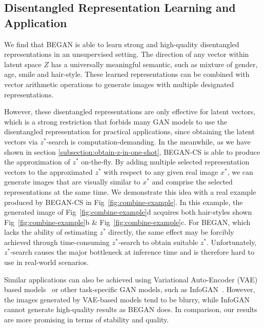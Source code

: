 \documentclass[runningheads]{llncs}
\begin{document}
    \subsection{Disentangled Representation Learning and Application}
    \label{subsection:method-disentangled-representation-and-application}
    
    We find that BEGAN is able to learn strong and high-quality disentangled representations in an unsupervised setting. The direction of any vector within latent space $Z$ has a universally meaningful semantic, such as mixture of gender, age, smile and hair-style. These learned representations can be combined with vector arithmetic operations to generate images with multiple designated representations.
    
    However, these disentangled representations are only effective for latent vectors, which is a strong restriction that forbids many GAN models to use the disentangled representation for practical applications, since obtaining the latent vectors via $z^*$-search is computation-demanding. In the meanwhile, as we have shown in section \ref{subsection:obtain-z-in-one-shot}, BEGAN-CS is able to produce the approximation of $z^*$ on-the-fly. By adding multiple selected representation vectors to the approximated $z^*$ with respect to any given real image $x^*$, we can generate images that are visually similar to $x^*$ and comprise the selected representations at the same time. We demonstrate this idea with a real example produced by BEGAN-CS in Fig~\ref{fig:combine-example}. In this example, the generated image of Fig~\ref{fig:combine-example}d acquires both hair-styles shown Fig~\ref{fig:combine-example}b \& Fig~\ref{fig:combine-example}c. For BEGAN, which lacks the ability of estimating $z^*$ directly, the same effect may be forcibly achieved through time-consuming $z^*$-search to obtain suitable $z^*$. Unfortunately, $z^*$-search causes the major bottleneck at inference time and is therefore hard to use in real-world scenarios.
    
    Similar applications can also be achieved using Variational Auto-Encoder (VAE) based models~\cite{VAE,beta-VAE,VAE-GAN} or other task-specific GAN models, such as InfoGAN~\cite{info-GANs}. However, the images generated by VAE-based models tend to be blurry, while InfoGAN cannot generate high-quality results as BEGAN does. In comparison, our results are more promising in terms of stability and quality.
    
\end{document}
